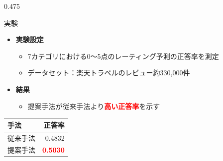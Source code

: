 \documentclass[unicode,10pt]{beamer}
\newcommand{\itemtitle}[1]{\textbf{#1}\\}
\newcommand{\fire}[1]{\textcolor{red}{\textbf{#1}}}
\newcommand{\columnsize}{0.475\textwidth}
\begin{document}
\begin{frame}
\begin{columns}[onlytextwidth,t]
\begin{column}{\columnsize}
  \begin{block}{実験}
    \begin{itemize}
      \item \itemtitle{実験設定}
        \begin{itemize}
          \item 7カテゴリにおける0〜5点のレーティング予測の正答率を測定
          \item データセット：楽天トラベルのレビュー約330,000件
        \end{itemize}
    \end{itemize}

    \begin{multicols}{2}
      \begin{itemize}
        \item \itemtitle{結果}
          \begin{itemize}
            \item 提案手法が従来手法より\fire{高い正答率}を示す
          \end{itemize}
      \end{itemize}
      \columnbreak
      \begin{table}
        \centering
        \begin{tabular}{l | r}
          手法 & 正答率 \\
          \hline
          従来手法\cite{fujitani15} & 0.4832 \\
          提案手法 & \fire{0.5030} \\
        \end{tabular}
      \end{table}
    \end{multicols}
  \end{block}


\end{column}
\end{columns}
\end{frame}
\end{document}
